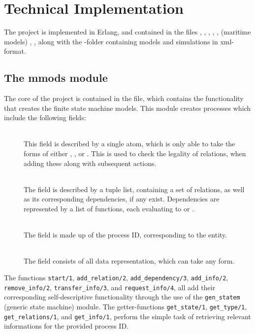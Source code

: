 \section{Technical Implementation}
The project is implemented in Erlang, and contained in the files , , , , , (maritime models) , , along with the -folder containing models and simulations in xml-format.

\subsection{The mmods module}
The core of the project is contained in the  file, which contains the functionality that creates the finite state machine models. This module creates processes which include the following fields:
\begin{description}
  \item[]\ \\
    This field is described by a single atom, which is only able to take the forms of either , , or . This is used to check the legality of relations, when adding these along with subsequent actions.
  \item[]\ \\
    The  field is described by a tuple list, containing a set of relations, as well as its corresponding dependencies, if any exist. Dependencies are represented by a list of functions, each evaluating to  or .
  \item[]\ \\
    The  field is made up of the process ID, corresponding to the entity.
  \item[]\ \\
    The  field consists of all data representation, which can take any form.
\end{description}
The functions \lstinline{start/1}, \lstinline{add_relation/2}, \lstinline{add_dependency/3}, \lstinline{add_info/2}, \linebreak \lstinline{remove_info/2}, \lstinline{transfer_info/3}, and \lstinline{request_info/4}, all add their corresponding self-descriptive functionality through the use of the \lstinline{gen_statem} (generic state machine) module. The getter-functions \lstinline{get_state/1}, \lstinline{get_type/1}, \lstinline{get_relations/1}, and \lstinline{get_info/1}, perform the simple task of retrieving relevant informations for the provided process ID.


